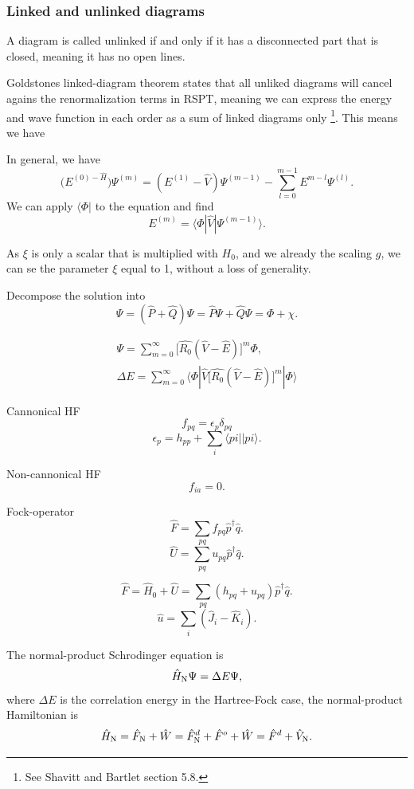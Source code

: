 \documentclass[a4paper, 11pt, notitlepage, english]{article}
\newcommand{\bra}[1]{\langle #1|}
\newcommand{\brakket}[2]{\langle #1 || #2 \rangle}
\newcommand{\op}[1]{\hat{#1}}
\newcommand{\braopket}[3]{\langle #1 | {#2} | #3 \rangle}
\newcommand{\eps}{\epsilon}
\begin{document}
\subsubsection*{Linked and unlinked diagrams}

A diagram is called unlinked if and only if it has a disconnected part that is closed, meaning it has no open lines.


Goldstones linked-diagram theorem states that all unliked diagrams will cancel agains the renormalization terms in RSPT, meaning we can express the energy and wave function in each order as a sum of linked diagrams only \footnote{See Shavitt and Bartlet section 5.8.}. This means we have

\clearpage

In general, we have
$$\big(E^{(0) - \op{H}}\big) \Psi^{(m)} = (E^{(1)}-\op{V})\Psi^{(m-1)} - \sum_{l=0}^{m-1} E^{m-l}\Psi^{(l)}.$$
We can apply $\bra{\Phi}$ to the equation and find
$$E^{(m)} = \braopket{\Phi}{\op{V}}{\Psi^{(m-1)}}.$$

As $\xi$ is only a scalar that is multiplied with $H_0$, and we already the scaling $g$, we can se the parameter $\xi$ equal to 1, without a loss of generality.

Decompose the solution into
$$\Psi = (\op{P} + \op{Q})\Psi = \op{P}\Psi + \op{Q}\Psi = \Phi + \chi.$$

\begin{align*}
\Psi = \sum_{m=0}^\infty \big[\op{R_0}(\op{V}-\op{E}) \big]^m \Phi, \\
\Delta E = \sum_{m=0}^\infty \braopket{\Phi}{\op{V}\big[\op{R_0}(\op{V}-\op{E}) \big]^m}{\Phi}
\end{align*}


Cannonical HF
$$f_{pq} = \eps_p \delta_{pq}$$
$$\eps_p = h_{pp} + \sum_{i} \brakket{pi}{pi}.$$

Non-cannonical HF
$$f_{ia} = 0.$$

Fock-operator
$$\op{F} = \sum_{pq} f_{pq}\op{p}^\dagger \op{q}.$$
$$\op{U} = \sum_{pq} u_{pq}\op{p}^\dagger \op{q}.$$

$$\op{F} = \op{H}_0 + \op{U} = \sum_{pq} (h_{pq} + u_{pq})\op{p}^\dagger \op{q}.$$
$$\op{u} = \sum_i (\op{J}_i - \op{K}_i).$$

The normal-product Schrodinger equation is
$$\op{H}_{\rm N} \Psi = \Delta E \Psi,$$
where $\Delta E$ is the correlation energy in the Hartree-Fock case, the normal-product Hamiltonian is
$$\op{H}_{\rm N} = \op{F}_{\rm N} + \op{W} = \op{F}^d_{\rm N} + \op{F}^o + \op{W} = \op{F}^d + \op{V}_{\rm N}.$$
\end{document}
